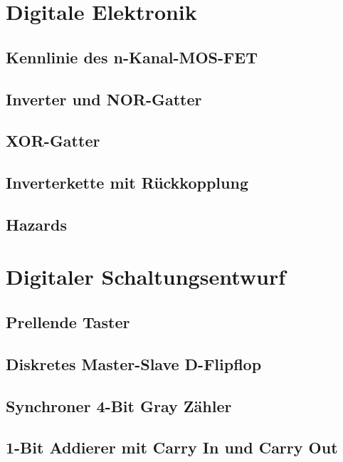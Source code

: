 \documentclass[paper=a4, fontsize=11pt]{scrartcl}
\numberwithin{equation}{section}
\numberwithin{figure}{section}
\numberwithin{table}{section}
\begin{document}
\newpage

\section{Digitale Elektronik}

\subsection{Kennlinie des n-Kanal-MOS-FET}

\subsection{Inverter und NOR-Gatter}

\subsection{XOR-Gatter}

\subsection{Inverterkette mit Rückkopplung}

\subsection{Hazards}


\newpage

\section{Digitaler Schaltungsentwurf}

\subsection{Prellende Taster}

\subsection{Diskretes Master-Slave D-Flipflop}

\subsection{Synchroner 4-Bit Gray Zähler}

\subsection{1-Bit Addierer mit Carry In und Carry Out}
\end{document}
